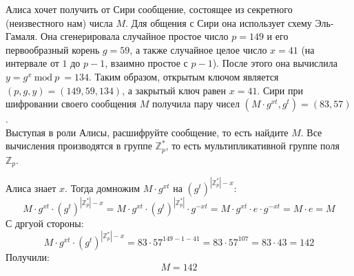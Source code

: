 \begin{problem}
    Алиса хочет получить от Сири сообщение, состоящее из секретного (неизвестного нам) числа $M$. Для общения с Сири она использует схему Эль-Гамаля. Она сгенерировала случайное простое число $p = 149$ и его первообразный корень $g = 59$, а также случайное целое число $x = 41$ (на интервале от $1$ до $p-1$, взаимно простое с $p-1$). После этого она вычислила $y = g^x \ \text{mod} \ p \ = 134$. Таким образом, открытым ключом является $(p, g, y) = (149,59,134)$, а закрытый ключ равен $x = 41$. Сири при шифровании своего сообщения $M$ получила пару чисел $(M \cdot g^{xt}, g^t) = (83,57)$. \\
Выступая в роли Алисы, расшифруйте сообщение, то есть найдите $M$. Все вычисления производятся в группе $\mathbb{Z}_p^*$, то есть мультипликативной группе поля $\mathbb{Z}_p$.    
\end{problem}

\begin{solution}
        Алиса знает $x$. Тогда домножим $M \cdot g^{xt}$ на $(g^t)^{|\mathbb{Z}_p^*| - x}$:
        \[
        M \cdot g^{xt} \cdot (g^t)^{|\mathbb{Z}_p^*| - x} = M \cdot g^{xt} \cdot (g^t)^{|\mathbb{Z}_p^*|} \cdot g^{-xt} = M \cdot g^{xt} \cdot e \cdot g^{-xt} = M \cdot e = M
        \]
        С дргуой стороны:
        \[
        M \cdot g^{xt} \cdot (g^t)^{|\mathbb{Z}_p^*| - x} = 83 \cdot 57^{149 - 1 - 41} = 83 \cdot 57^{107} = 83 \cdot 43 = 142
        \]
        Получили:
        \[
        M = 142
        \]
\end{solution}